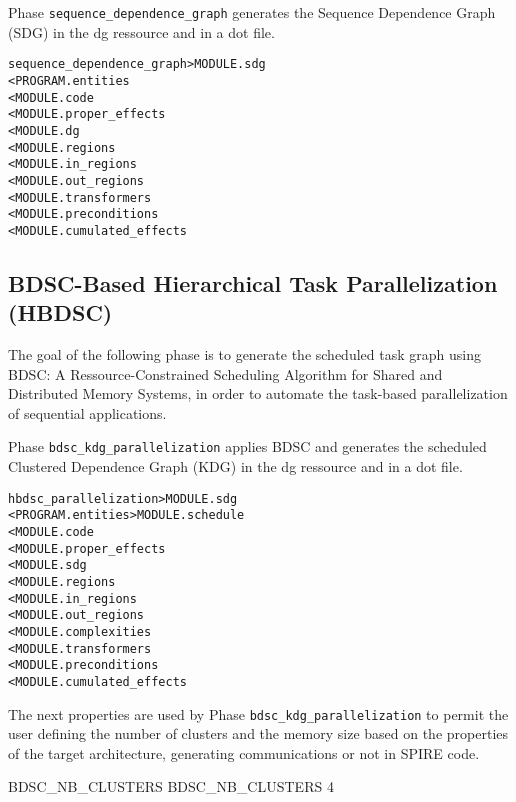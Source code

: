 \documentclass[a4paper]{report}
\newenvironment{PipsMake}{\begin{alltt}}{\end{alltt}}
\newenvironment{PipsPass}[1]{\label{pass:#1}}{}
\begin{document}
\begin{PipsPass}{sequence_dependence_graph}
Phase \texttt{sequence\_dependence\_graph} generates the Sequence
Dependence Graph (SDG) in the dg ressource and in a dot file.
\end{PipsPass}

\begin{PipsMake}
sequence_dependence_graph                       > MODULE.sdg                    
        < PROGRAM.entities                  
        < MODULE.code
        < MODULE.proper_effects
        < MODULE.dg
        < MODULE.regions
        < MODULE.in_regions
        < MODULE.out_regions
        < MODULE.transformers
        < MODULE.preconditions
        < MODULE.cumulated_effects
\end{PipsMake}

\subsection{BDSC-Based Hierarchical  Task Parallelization (HBDSC)}
The goal of the following phase is to generate the scheduled task
graph using BDSC: A Ressource-Constrained Scheduling Algorithm for
Shared and Distributed Memory Systems, in order
to automate the task-based parallelization of sequential
applications. 

\begin{PipsPass}{hbdsc_parallelization}
Phase \texttt{bdsc\_kdg\_parallelization} applies BDSC and generates
the scheduled Clustered Dependence Graph (KDG) in the dg ressource and
in a dot file.
\end{PipsPass}

\begin{PipsMake}
hbdsc_parallelization                       > MODULE.sdg                    
        < PROGRAM.entities                  > MODULE.schedule
        < MODULE.code
        < MODULE.proper_effects
        < MODULE.sdg
        < MODULE.regions
        < MODULE.in_regions
        < MODULE.out_regions
        < MODULE.complexities
        < MODULE.transformers
        < MODULE.preconditions
        < MODULE.cumulated_effects
\end{PipsMake}

The next properties are used by Phase \texttt{bdsc\_kdg\_parallelization} to
permit the user defining the number of clusters and the memory size based
on the properties of the target architecture, generating communications or not
in SPIRE code.

\begin{PipsProp}{BDSC_NB_CLUSTERS}
BDSC_NB_CLUSTERS 4
\end{PipsProp}
\end{document}
